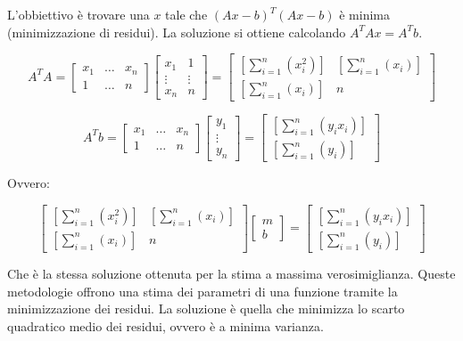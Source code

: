 \documentclass[\main/main.tex]{subfiles}
\begin{document}
L'obbiettivo è trovare una $x$ tale che $(Ax-b)^T(Ax-b)$ è minima (minimizzazione di residui).
La soluzione si ottiene calcolando $A^TAx = A^Tb$.

\[
A^TA = \begin{bmatrix}
	x_1 & \dots & x_n\\
	1 & \dots & n
\end{bmatrix}
\begin{bmatrix}
	x_1 & 1\\
	\vdots & \vdots \\
	x_n & n
\end{bmatrix}
=
\begin{bmatrix}
	\left [ \sum_{i=1}^n \left(x_i^2 \right) \right ] &  \left [ \sum_{i=1}^n \left(x_i \right) \right ] \\
	\left [ \sum_{i=1}^n \left(x_i \right) \right ] & n
\end{bmatrix}
\]

\[
A^Tb = \begin{bmatrix}
	x_1 & \dots & x_n\\
	1 & \dots & n
\end{bmatrix}
\begin{bmatrix}
	y_1\\
	\vdots\\
	y_n
\end{bmatrix}
=
\begin{bmatrix}
	\left [ \sum_{i=1}^n \left(y_i x_i \right) \right ] \\
	\left [ \sum_{i=1}^n \left(y_i \right) \right ]
\end{bmatrix}
\]

Ovvero:

\[
\begin{bmatrix}
	\left [ \sum_{i=1}^n \left(x_i^2 \right) \right ] &  \left [ \sum_{i=1}^n \left(x_i \right) \right ] \\
	\left [ \sum_{i=1}^n \left(x_i \right) \right ] & n
\end{bmatrix}
\begin{bmatrix}
m\\
b
\end{bmatrix}
= 
\begin{bmatrix}
	\left [ \sum_{i=1}^n \left(y_i x_i \right) \right ] \\
	\left [ \sum_{i=1}^n \left(y_i \right) \right ]
\end{bmatrix}
\]

Che è la stessa soluzione ottenuta per la stima a massima verosimiglianza. Queste metodologie offrono una stima dei parametri di una funzione tramite la minimizzazione dei residui.
La soluzione è quella che minimizza lo scarto quadratico medio dei residui, ovvero è a minima varianza.
\end{document}
